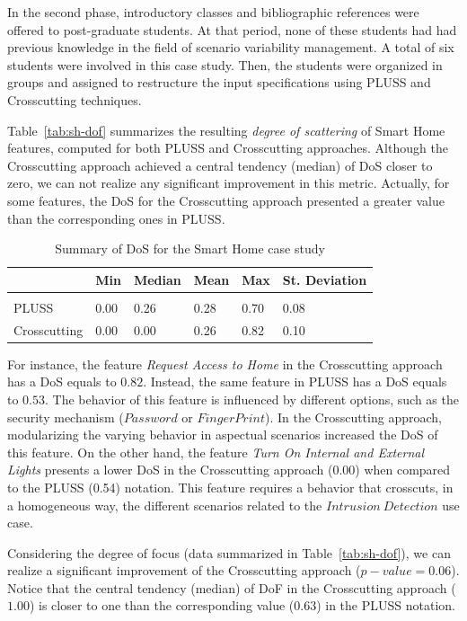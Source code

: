 \documentclass{acm_proc_article-sp}
\begin{document}
In the second phase, introductory classes and bibliographic references were
offered to post-graduate students. At that period, none of these students had had
previous knowledge in the field of scenario variability management. A total of
six students were involved in this case study. Then, the students were organized
in groups and assigned to restructure the input specifications using PLUSS and
Crosscutting techniques.


Table~\ref{tab:sh-dof} summarizes the resulting \emph{degree of scattering} of
Smart Home features, computed for both PLUSS and Crosscutting approaches. Although the
Crosscutting approach achieved a central tendency (median) of DoS closer to
zero, we can not realize any significant improvement in this metric. Actually, for some
features, the DoS for the Crosscutting approach presented a greater value than
the corresponding ones in PLUSS.

\begin{table}[htb]
\centering
\caption{Summary of DoS for the Smart Home case study}
\label{tab:sh-dos}
\begin{small}
\begin{tabular}{llllll} \hline
					& Min 	& Median 	& Mean 	& Max 	& St. Deviation \\ \hline \\
	PLUSS			& 0.00  & 0.26   	& 0.28  & 0.70 	& 0.08 			\\
	Crosscutting	& 0.00  & 0.00  	& 0.26 	& 0.82 & 0.10  		\\ \hline	
\end{tabular}
\end{small}
\end{table}

For instance, the feature \emph{Request Access to Home} in the Crosscutting
approach has a DoS equals to $0.82$. Instead, the same feature in PLUSS has a
DoS equals to $0.53$. The behavior of this feature is influenced by different
options, such as the security mechanism ($Password$ or $Finger Print$).
In the Crosscutting approach, modularizing the varying behavior in
aspectual scenarios increased the DoS of this feature.
On the other hand, the feature \emph{Turn On Internal and External Lights}
presents a lower DoS in the Crosscutting approach (0.00) when compared to the
PLUSS (0.54) notation. This feature requires a behavior that crosscuts, in a
homogeneous way, the different scenarios related to the $Intrusion\ Detection$
use case.

Considering the degree of focus (data summarized in Table~\ref{tab:sh-dof}), we
can realize a significant improvement of the Crosscutting approach
($p-value=0.06$). Notice that the central tendency (median) of DoF in the
Crosscutting approach ($1.00$) is closer to one than the corresponding value
($0.63$) in the PLUSS notation.
\end{document}
